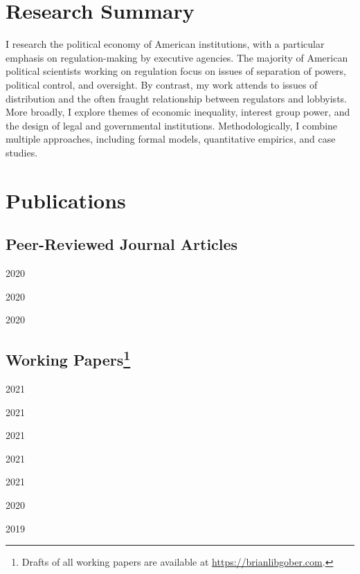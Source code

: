 \documentclass[12pt,letterpaper]{report}
\begin{document}
    \section*{Research Summary}
    I research the political economy of American institutions, with a particular emphasis on regulation-making by executive agencies. The majority of American political scientists working on regulation focus on issues of separation of powers, political control, and oversight. By contrast, my work attends to issues of distribution and the often fraught relationship between regulators and lobbyists. More broadly, I explore themes of economic inequality, interest group power, and the design of legal and governmental institutions. Methodologically, I combine multiple approaches, including formal models, quantitative empirics, and case studies.
    
    \section*{Publications}

    \subsection*{Peer-Reviewed Journal Articles}
    \begin{tablist}
    \item[2020] \tab{}
    
    \item[2020] \tab{}
    
    \item[2020] \tab{}
    \end{tablist}
    
    \subsection*{Working Papers\footnote[2]{Drafts of all working papers are available at \href{https://brianlibgober.com}{https://brianlibgober.com}.}}
    \begin{tablist}
    \item[2021] \tab{}
    \item[2021] \tab{}
    \item[2021] \tab{}
    \item[2021] \tab{}
    \item[2021] \tab{}
    \item[2020] \tab{} %
    \item[2019] \tab{}
    \end{tablist}
    
\end{document}
